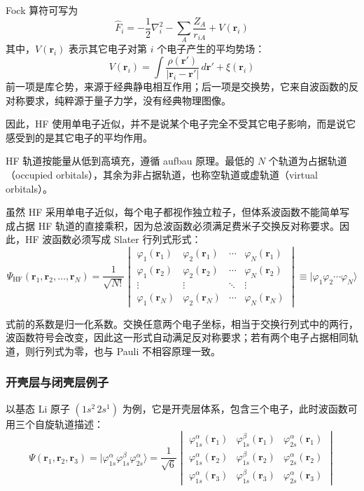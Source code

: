 Fock 算符可写为
\[
\hat F_i
=
-\frac{1}{2}\nabla_i^2
-\sum_A \frac{Z_A}{r_{iA}}
+V(\mathbf r_i)
\]
其中，$V(\mathbf r_i)$ 表示其它电子对第 $i$ 个电子产生的平均势场：
\[
V(\mathbf r_i)
=
\int \frac{\rho(\mathbf r')}{|\mathbf r_i-\mathbf r'|}\,d\mathbf r'
+\xi(\mathbf r_i)
\]
前一项是库仑势，来源于经典静电相互作用；后一项是交换势，它来自波函数的反对称要求，纯粹源于量子力学，没有经典物理图像。

因此，HF 使用单电子近似，并不是说某个电子完全不受其它电子影响，而是说它感受到的是其它电子的平均作用。

HF 轨道按能量从低到高填充，遵循 aufbau 原理。最低的 $N$ 个轨道为占据轨道（occupied orbitals），其余为非占据轨道，也称空轨道或虚轨道（virtual orbitals）。

虽然 HF 采用单电子近似，每个电子都视作独立粒子，但体系波函数不能简单写成占据 HF 轨道的直接乘积，因为总波函数必须满足费米子交换反对称要求。因此，HF 波函数必须写成 Slater 行列式形式：
\[
\Psi_{\mathrm{HF}}(\mathbf r_1,\mathbf r_2,\ldots,\mathbf r_N)
=
\frac{1}{\sqrt{N!}}
\begin{vmatrix}
\varphi_1(\mathbf r_1) & \varphi_2(\mathbf r_1) & \cdots & \varphi_N(\mathbf r_1) \\
\varphi_1(\mathbf r_2) & \varphi_2(\mathbf r_2) & \cdots & \varphi_N(\mathbf r_2) \\
\vdots & \vdots & \ddots & \vdots \\
\varphi_1(\mathbf r_N) & \varphi_2(\mathbf r_N) & \cdots & \varphi_N(\mathbf r_N)
\end{vmatrix}
\equiv
\lvert \varphi_1\varphi_2\cdots\varphi_N\rangle
\]

式前的系数是归一化系数。交换任意两个电子坐标，相当于交换行列式中的两行，波函数符号会改变，因此这一形式自动满足反对称要求；若有两个电子占据相同轨道，则行列式为零，也与 Pauli 不相容原理一致。

\subsubsection*{开壳层与闭壳层例子}

以基态 Li 原子 $\left(1s^2\,2s^1\right)$ 为例，它是开壳层体系，包含三个电子，此时波函数可用三个自旋轨道描述：
\[
\Psi(\mathbf r_1,\mathbf r_2,\mathbf r_3)
=
\lvert \varphi_{1s}^{\alpha}\varphi_{1s}^{\beta}\varphi_{2s}^{\alpha}\rangle
=
\frac{1}{\sqrt{6}}
\begin{vmatrix}
\varphi_{1s}^{\alpha}(\mathbf r_1) & \varphi_{1s}^{\beta}(\mathbf r_1) & \varphi_{2s}^{\alpha}(\mathbf r_1) \\
\varphi_{1s}^{\alpha}(\mathbf r_2) & \varphi_{1s}^{\beta}(\mathbf r_2) & \varphi_{2s}^{\alpha}(\mathbf r_2) \\
\varphi_{1s}^{\alpha}(\mathbf r_3) & \varphi_{1s}^{\beta}(\mathbf r_3) & \varphi_{2s}^{\alpha}(\mathbf r_3)
\end{vmatrix}
\]

